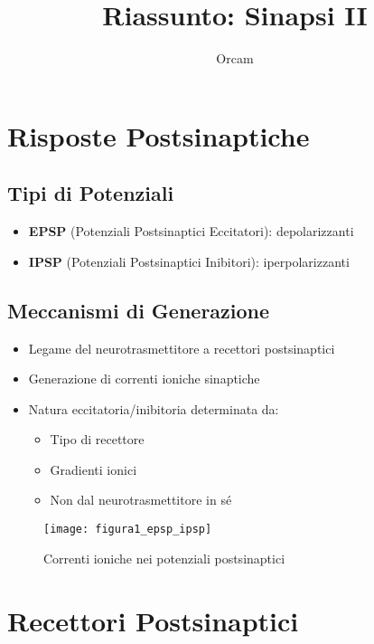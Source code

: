 \documentclass{article}
\title{Riassunto: Sinapsi II}
\author{Orcam}
\date{}
\begin{document}
\maketitle

\section{Risposte Postsinaptiche}
\subsection{Tipi di Potenziali}
\begin{itemize}
\item \textbf{EPSP} (Potenziali Postsinaptici Eccitatori): depolarizzanti
\item \textbf{IPSP} (Potenziali Postsinaptici Inibitori): iperpolarizzanti
\end{itemize}

\subsection{Meccanismi di Generazione}
\begin{itemize}
\item Legame del neurotrasmettitore a recettori postsinaptici
\item Generazione di correnti ioniche sinaptiche
\item Natura eccitatoria/inibitoria determinata da:
  \begin{itemize}
  \item Tipo di recettore
  \item Gradienti ionici
  \item Non dal neurotrasmettitore in sé
  \end{itemize}
\end{itemize}

\begin{figure}[h]
\centering
\texttt{[image: figura1\_epsp\_ipsp]}
\caption{Correnti ioniche nei potenziali postsinaptici}
\label{fig:epsp_ipsp}
\end{figure}

\section{Recettori Postsinaptici}
\end{document}
